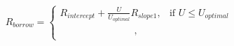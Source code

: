 \documentclass[preview]{standalone}
\begin{document}
\begin{align*}
R_{borrow} = \begin{cases} R_{intercept} + \frac{U}{U_{optimal}}R_{slope1}, & \text{if } U \leq U_{optimal} \\[6pt] \phantom{R_{intercept} + R_{slope2}}, & \phantom{\text{if } U > U_{optimal}} \end{cases}
\end{align*}
\end{document}
